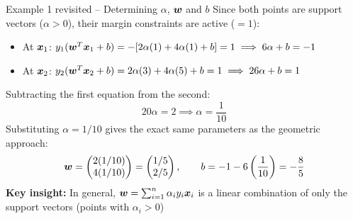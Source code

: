 \documentclass[aspectratio=169]{beamer}\usepackage[]{graphicx}\usepackage[]{xcolor}
\begin{document}
\begin{frame}{Example 1 revisited -- Determining $\alpha$, $\bm{w}$ and $b$}
    Since both points are support vectors ($\alpha > 0$), their margin constraints are active ($= 1$):
    \begin{itemize}
        \item At $\bm{x}_1$: $y_1(\bm{w}^T \bm{x}_1 + b) = -[2\alpha(1) + 4\alpha(1) + b] = 1 \implies 6\alpha + b = -1$
        \item At $\bm{x}_2$: $y_2(\bm{w}^T \bm{x}_2 + b) = 2\alpha(3) + 4\alpha(5) + b = 1 \implies 26\alpha + b = 1$
    \end{itemize}
    \vfill
    Subtracting the first equation from the second:
    \[
        20\alpha = 2 \implies \alpha = \frac{1}{10}
    \]
    \vfill
    Substituting $\alpha = 1/10$ gives the exact same parameters as the geometric approach:
    \[
        \bm{w} = \begin{pmatrix} 2(1/10) \\ 4(1/10) \end{pmatrix} = \begin{pmatrix} 1/5 \\ 2/5 \end{pmatrix}, \qquad b = -1 - 6\left(\frac{1}{10}\right) = -\frac{8}{5}
    \]
    \vfill
    \textbf{Key insight:} In general, $\bm{w} = \sum_{i=1}^n \alpha_i y_i \bm{x}_i$ is a linear combination of only the support vectors (points with $\alpha_i > 0$)
\end{frame}
\end{document}
